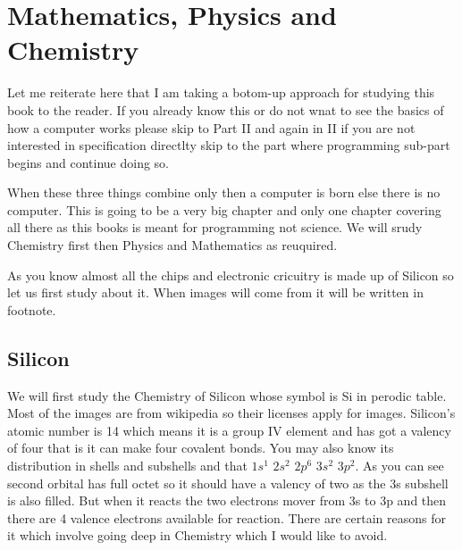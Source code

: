 

\chapter{Mathematics, Physics and Chemistry}
\startcolumns[n=3,distance=2em]
  \placelist
    [section]
    [alternative=c, %
     interaction=all,]
\stopcolumns
Let me reiterate here that I am taking a botom-up approach for
studying this book to the reader. If you already know this or do not
wnat to see the basics of how a computer works please skip to Part II
and again in II if you are not interested in specification directlty
skip to the part where programming sub-part begins and continue doing
so.

When these three things combine  only then a computer is born else
there is no computer. This is going to be a very big chapter and only
one chapter covering all there as this books is meant for programming
not science. We will srudy Chemistry first then Physics and
Mathematics as reuquired.

As you know almost all the chips and electronic cricuitry is made up
of Silicon so let us first study about it. When images will come from 
\from[wikipedia] it will be written in footnote.

\section{Silicon}
We will first study the Chemistry of Silicon whose symbol is Si in
perodic table. Most of the images are from wikipedia so their licenses
apply for images. Silicon's atomic number is 14 which means it is a
group IV element and has got a valency of four that is it can make
four covalent bonds. You may also know its distribution in shells and
subshells and that $1s^1$ $2s^2$ $2p^6$ $3s^2$ $3p^2$. As you can see second
orbital has full octet so it should have a valency of two as the 3s
subshell is also filled. But when it reacts the two electrons mover
from 3s to 3p and then there are 4 valence electrons available for
reaction. There are certain reasons for it which involve going deep in
Chemistry which I would like to avoid.


